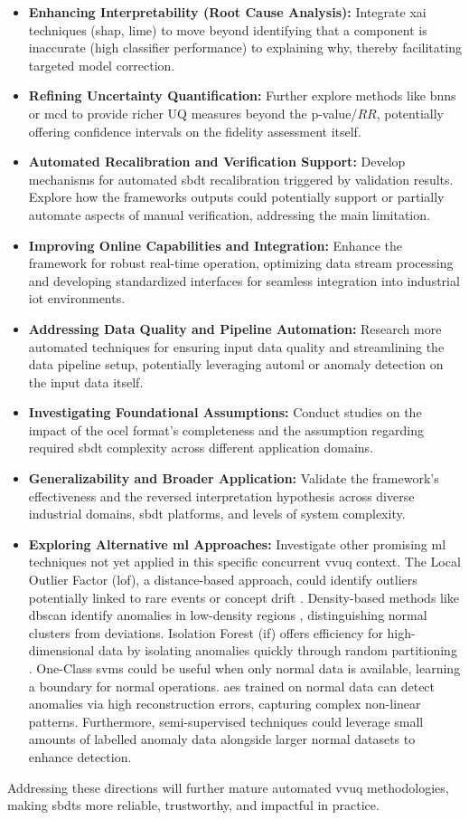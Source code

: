 \begin{itemize}
  \item \textbf{Enhancing Interpretability (Root Cause Analysis):} Integrate \gls{xai} techniques (\gls{shap}, \gls{lime}) to move beyond identifying that a component is inaccurate (high classifier performance) to explaining why, thereby facilitating targeted model correction.
  \item \textbf{Refining Uncertainty Quantification:} Further explore methods like \gls{bnn}s or \gls{mcd} to provide richer UQ measures beyond the p-value/$RR$, potentially offering confidence intervals on the fidelity assessment itself.
  \item \textbf{Automated Recalibration and Verification Support:} Develop mechanisms for automated \gls{sbdt} recalibration triggered by validation results. Explore how the frameworks outputs could potentially support or partially automate aspects of manual verification, addressing the main limitation.
  \item \textbf{Improving Online Capabilities and Integration:} Enhance the framework for robust real-time operation, optimizing data stream processing and developing standardized interfaces for seamless integration into industrial \gls{iot} environments.
  \item \textbf{Addressing Data Quality and Pipeline Automation:} Research more automated techniques for ensuring input data quality and streamlining the data pipeline setup, potentially leveraging \gls{automl} or anomaly detection on the input data itself.
  \item \textbf{Investigating Foundational Assumptions:} Conduct studies on the impact of the \gls{ocel} format's completeness and the assumption regarding required \gls{sbdt} complexity across different application domains.
  \item \textbf{Generalizability and Broader Application:} Validate the framework's effectiveness and the reversed interpretation hypothesis across diverse industrial domains, \gls{sbdt} platforms, and levels of system complexity.
  \item \textbf{Exploring Alternative \gls{ml} Approaches:} Investigate other promising \gls{ml} techniques not yet applied in this specific concurrent \gls{vvuq} context. The Local Outlier Factor (\gls{lof}), a distance-based approach, could identify outliers potentially linked to rare events or concept drift \autocite{alghushairy2020review}. Density-based methods like \gls{dbscan} identify anomalies in low-density regions \autocite{ccelik2011anomaly}, distinguishing normal clusters from deviations. Isolation Forest (\gls{if}) offers efficiency for high-dimensional data by isolating anomalies quickly through random partitioning \autocite{xu2017improved}. One-Class \gls{svm}s \autocite{li2003improving} could be useful when only normal data is available, learning a boundary for normal operations. \gls{ae}s \autocite{zhou2017anomaly} trained on normal data can detect anomalies via high reconstruction errors, capturing complex non-linear patterns. Furthermore, semi-supervised techniques could leverage small amounts of labelled anomaly data alongside larger normal datasets to enhance detection.
\end{itemize}

Addressing these directions will further mature automated \gls{vvuq} methodologies, making \gls{sbdt}s more reliable, trustworthy, and impactful in practice. \blacksquare